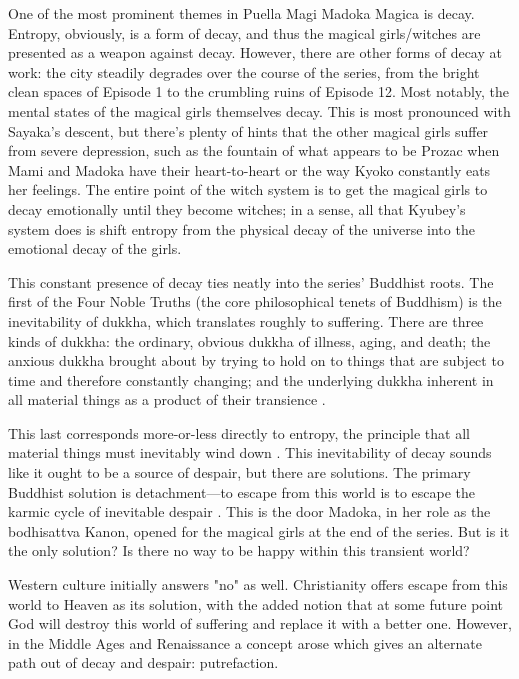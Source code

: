 One of the most prominent themes in Puella Magi Madoka Magica is decay. Entropy, obviously, is a form of decay, and thus the magical girls/witches are presented as a weapon against decay. However, there are other forms of decay at work: the city steadily degrades over the course of the series, from the bright clean spaces of Episode 1 to the crumbling ruins of Episode 12. Most notably, the mental states of the magical girls themselves decay. This is most pronounced with Sayaka's descent, but there's plenty of hints that the other magical girls suffer from severe depression, such as the fountain of what appears to be Prozac when Mami and Madoka have their heart-to-heart or the way Kyoko constantly eats her feelings. The entire point of the witch system is to get the magical girls to decay emotionally until they become witches; in a sense, all that Kyubey's system does is shift entropy from the physical decay of the universe into the emotional decay of the girls.

This constant presence of decay ties neatly into the series' Buddhist roots. The first of the Four Noble Truths (the core philosophical tenets of Buddhism) is the inevitability of dukkha, which translates roughly to suffering. There are three kinds of dukkha: the ordinary, obvious dukkha of illness, aging, and death; the anxious dukkha brought about by trying to hold on to things that are subject to time and therefore constantly changing; and the underlying dukkha inherent in all material things as a product of their transience \cite{ref108}. 

This last corresponds more-or-less directly to entropy, the principle that all material things must inevitably wind down \cite{ref109}. This inevitability of decay sounds like it ought to be a source of despair, but there are solutions. The primary Buddhist solution is detachment—to escape from this world is to escape the karmic cycle of inevitable despair \cite{ref110}. This is the door Madoka, in her role as the bodhisattva Kanon, opened for the magical girls at the end of the series. But is it the only solution? Is there no way to be happy within this transient world?

Western culture initially answers "no" as well. Christianity offers escape from this world to Heaven as its solution, with the added notion that at some future point God will destroy this world of suffering and replace it with a better one. However, in the Middle Ages and Renaissance a concept arose which gives an alternate path out of decay and despair: putrefaction.

